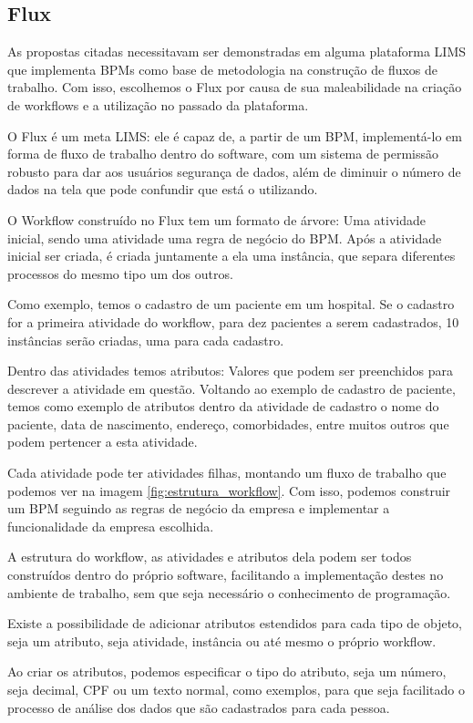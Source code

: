 \subsection{Flux}

As propostas citadas necessitavam ser demonstradas em alguma plataforma LIMS que implementa BPMs como base de metodologia na construção de fluxos de trabalho. Com isso, escolhemos o Flux por causa de sua maleabilidade na criação de workflows e a utilização no passado da plataforma.

O Flux é um meta LIMS: ele é capaz de, a partir de um BPM, implementá-lo em forma de fluxo de trabalho dentro do software, com um sistema de permissão robusto para dar aos usuários segurança de dados, além de diminuir o número de dados na tela que pode confundir que está o utilizando.

O Workflow construído no Flux tem um formato de árvore: Uma atividade inicial, sendo uma atividade uma regra de negócio do BPM. Após a atividade inicial ser criada, é criada juntamente a ela uma instância, que separa diferentes processos do mesmo tipo um dos outros.

Como exemplo, temos o cadastro de um paciente em um hospital. Se o cadastro for a primeira atividade do workflow, para dez pacientes a serem cadastrados, 10 instâncias serão criadas, uma para cada cadastro.

Dentro das atividades temos atributos: Valores que podem ser preenchidos para descrever a atividade em questão. Voltando ao exemplo de cadastro de paciente, temos como exemplo de atributos dentro da atividade de cadastro o nome do paciente, data de nascimento, endereço, comorbidades, entre muitos outros que podem pertencer a esta atividade.

Cada atividade pode ter atividades filhas, montando um fluxo de trabalho que podemos ver na imagem \ref{fig:estrutura_workflow}. Com isso, podemos construir um BPM seguindo as regras de negócio da empresa e implementar a funcionalidade da empresa escolhida.

A estrutura do workflow, as atividades e atributos dela podem ser todos construídos dentro do próprio software, facilitando a implementação destes no ambiente de trabalho, sem que seja necessário o conhecimento de programação.

Existe a possibilidade de adicionar atributos estendidos para cada tipo de objeto, seja um atributo, seja atividade, instância ou até mesmo o próprio workflow.

Ao criar os atributos, podemos especificar o tipo do atributo, seja um número, seja decimal, CPF ou um texto normal, como exemplos, para que seja facilitado o processo de análise dos dados que são cadastrados para cada pessoa.

